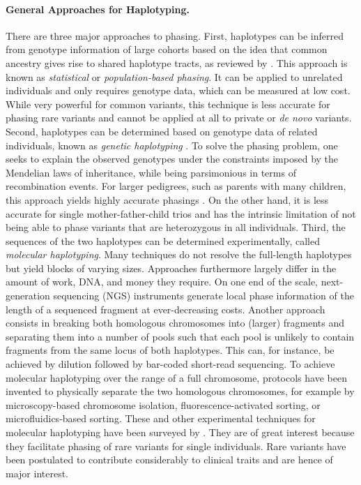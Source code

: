 \paragraph{General Approaches for Haplotyping.}
There are three major approaches to phasing.
First, haplotypes can be inferred from genotype information of large cohorts based on the idea that common ancestry gives rise to shared haplotype tracts, as reviewed by \cite{Browning2011}.
This approach is known as \emph{statistical} or \emph{population-based phasing}.
It can be applied to unrelated individuals and only requires genotype data, which can be measured at low cost.
While very powerful for common variants, this technique is less accurate for phasing rare variants and cannot be applied at all to private or \textit{de novo} variants.
%
Second, haplotypes can be determined based on genotype data of related individuals, known as \emph{genetic haplotyping} \citep{Glusman2014}.
To solve the phasing problem, one seeks to explain the observed genotypes under the constraints imposed by the Mendelian laws of inheritance, while being parsimonious in terms of recombination events.
For larger pedigrees, such as parents with many children, this approach yields highly accurate phasings \citep{Roach2011}.
On the other hand, it is less accurate for single mother-father-child trios and has the intrinsic limitation of not being able to phase variants that are heterozygous in all individuals.
%
Third, the sequences of the two haplotypes can be determined experimentally, called \emph{molecular haplotyping}.
Many techniques do not resolve the full-length haplotypes but yield blocks of varying sizes.
Approaches furthermore largely differ in the amount of work, DNA, and money they require.
On one end of the scale, next-generation sequencing (NGS) instruments generate local phase information of the length of a sequenced fragment at ever-decreasing costs.
Another approach consists in breaking both homologous chromosomes into (larger) fragments and separating them into a number of pools such that each pool is unlikely to contain fragments from the same locus of both haplotypes.
This can, for instance, be achieved by dilution followed by bar-coded short-read sequencing.
To achieve molecular haplotyping over the range of a full chromosome, protocols have been invented to physically separate the two homologous chromosomes, for example by microscopy-based chromosome isolation, fluorescence-activated sorting, or microfluidics-based sorting.
These and other experimental techniques for molecular haplotyping have been surveyed by \cite{Snyder2015}.
They are of great interest because they facilitate phasing of rare variants for single individuals.
Rare variants have been postulated to contribute considerably to clinical traits and are hence of major interest.

